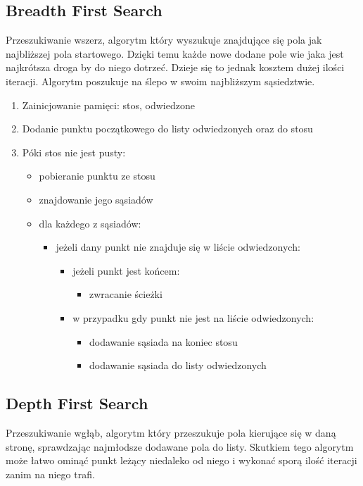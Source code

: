 \documentclass{article}
\begin{document}
\subsection{Breadth First Search}
Przeszukiwanie wszerz, algorytm który wyszukuje znajdujące się pola jak najbliższej pola startowego. Dzięki temu każde nowe dodane pole wie jaka jest najkrótsza droga by do niego dotrzeć. Dzieje się to jednak kosztem dużej ilości iteracji. Algorytm poszukuje na ślepo w swoim najbliższym sąsiedztwie.
\begin{enumerate}
\item Zainicjowanie pamięci: stos, odwiedzone
\item Dodanie punktu początkowego do listy odwiedzonych oraz do stosu
\item Póki stos nie jest pusty:
	\begin{itemize}
	\item pobieranie punktu ze stosu
	\item znajdowanie jego sąsiadów
	\item dla każdego z sąsiadów:
	\begin{itemize}
		\item jeżeli dany punkt nie znajduje się w liście odwiedzonych:
			\begin{itemize}
			\item jeżeli punkt jest końcem:
				\begin{itemize}
				\item zwracanie ścieżki
				\end{itemize}
			\item w przypadku gdy punkt nie jest na liście odwiedzonych:
				\begin{itemize}
				\item dodawanie sąsiada na koniec stosu
				\item dodawanie sąsiada do listy odwiedzonych				
				\end{itemize}
			\end{itemize}
		\end{itemize}		
	\end{itemize}
\end{enumerate}

\subsection{Depth First Search}
Przeszukiwanie wgłąb, algorytm który przeszukuje pola kierujące się w daną stronę, sprawdzając najmłodsze dodawane pola do listy. Skutkiem tego algorytm może łatwo ominąć punkt leżący niedaleko od niego i wykonać sporą ilość iteracji zanim na niego trafi.
\end{document}

